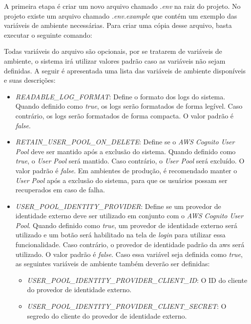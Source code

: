 A primeira etapa é criar um novo arquivo chamado \textit{.env} na raiz do projeto. No projeto existe um arquivo chamado \textit{.env.example} que contém um exemplo das variáveis de ambiente necessárias. Para criar uma cópia desse arquivo, basta executar o seguinte comando:


Todas variáveis do arquivo são opcionais, por se tratarem de variáveis de ambiente, o sistema irá utilizar valores padrão caso as variáveis não sejam definidas. A seguir é apresentada uma lista das variáveis de ambiente disponíveis e suas descrições:

\begin{itemize}
    \item \textit{READABLE\_LOG\_FORMAT}: Define o formato dos logs do sistema. Quando definido como \textit{true}, os logs serão formatados de forma legível. Caso contrário, os logs serão formatados de forma compacta. O valor padrão é \textit{false}.

    \item \textit{RETAIN\_USER\_POOL\_ON\_DELETE}: Define se o \textit{AWS Cognito User Pool} deve ser mantido após a exclusão do sistema. Quando definido como \textit{true}, o \textit{User Pool} será mantido. Caso contrário, o \textit{User Pool} será excluído. O valor padrão é \textit{false}. Em ambientes de produção, é recomendado manter o \textit{User Pool} após a exclusão do sistema, para que os usuários possam ser recuperados em caso de falha.

    \item \textit{USER\_POOL\_IDENTITY\_PROVIDER}: Define se um provedor de identidade externo deve ser utilizado em conjunto com o \textit{AWS Cognito User Pool}. Quando definido como \textit{true}, um provedor de identidade externo será utilizado e um botão será habilitado na tela de \textit{login} para utilizar essa funcionalidade. Caso contrário, o provedor de identidade padrão da \gls{aws} será utilizado. O valor padrão é \textit{false}. Caso essa variável seja definida como \textit{true}, as seguintes variáveis de ambiente também deverão ser definidas:

    \begin{itemize}
        \item \textit{USER\_POOL\_IDENTITY\_PROVIDER\_CLIENT\_ID}: O ID do cliente do provedor de identidade externo.

        \item \textit{USER\_POOL\_IDENTITY\_PROVIDER\_CLIENT\_SECRET}: O segredo do cliente do provedor de identidade externo.


\end{itemize}
\end{itemize}
